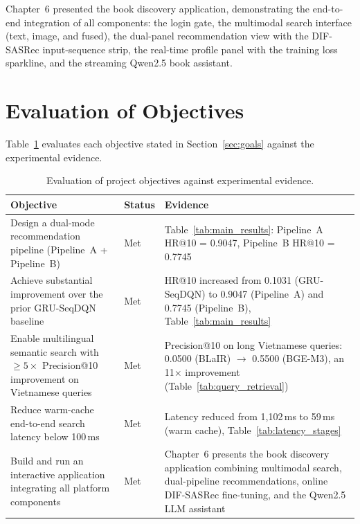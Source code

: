 Chapter~6 presented the book discovery application, demonstrating the end-to-end integration of all components: the login gate, the multimodal search interface (text, image, and fused), the dual-panel recommendation view with the DIF-SASRec input-sequence strip, the real-time profile panel with the training loss sparkline, and the streaming Qwen2.5 book assistant.


\section{Evaluation of Objectives}
\label{sec:conclusion_objectives}

Table~\ref{tab:objectives} evaluates each objective stated in Section~\ref{sec:goals} against the experimental evidence.

\begin{table}[H]
\centering
\caption{Evaluation of project objectives against experimental evidence.}
\label{tab:objectives}
\begin{tabular}{p{5.8cm} p{2.2cm} p{5.5cm}}
\hline
\textbf{Objective} & \textbf{Status} & \textbf{Evidence} \\
\hline
Design a dual-mode recommendation pipeline (Pipeline~A + Pipeline~B) &
Met &
Table~\ref{tab:main_results}: Pipeline~A HR@10 = 0.9047, Pipeline~B HR@10 = 0.7745 \\

Achieve substantial improvement over the prior GRU-SeqDQN baseline &
Met &
HR@10 increased from 0.1031 (GRU-SeqDQN) to 0.9047 (Pipeline~A) and 0.7745 (Pipeline~B), Table~\ref{tab:main_results} \\

Enable multilingual semantic search with $\geq 5\times$ Precision@10 improvement on Vietnamese queries &
Met &
Precision@10 on long Vietnamese queries: 0.0500 (BLaIR) $\to$ 0.5500 (BGE-M3), an 11$\times$ improvement (Table~\ref{tab:query_retrieval}) \\

Reduce warm-cache end-to-end search latency below 100\,ms &
Met &
Latency reduced from 1{,}102\,ms to 59\,ms (warm cache), Table~\ref{tab:latency_stages} \\

Build and run an interactive application integrating all platform components &
Met &
Chapter~6 presents the book discovery application combining multimodal search, dual-pipeline recommendations, online DIF-SASRec fine-tuning, and the Qwen2.5 LLM assistant \\
\hline
\end{tabular}
\end{table}

